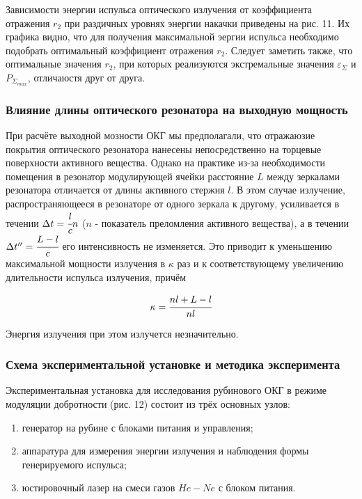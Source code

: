\documentclass[a4paper,14pt,russian]{article}
\begin{document}
Зависимости энергии испульса оптического излучения от коэффициента отражения $r_2$ при раздичных уровнях энергии накачки приведены на рис. 11. Их графика видно, что для получения максимальной эергии испульса необходимо подобрать оптимальный коэффициент отражения $r_2$. Следует заметить также, что оптимальные значения $r_2$, при которых реализуются экстремальные значения $\varepsilon_{\Sigma}$ и $P_{\Sigma_{max}}$, отличаюстя друг от друга.

\subsubsection{Влияние длины оптического резонатора на выходную мощность}

При расчёте выходной мозности ОКГ мы предполагали, что отражаюзие покрытия оптического резонатора нанесены непосредственно на торцевые поверхности активного вещества. Однако на практике из-за необходимости помещения в резонатор модулирующей ячейки расстояние $L$ между зеркалами резонатора отличается от длины активного стержня $l$. В этом случае излучение, распространяющееся в резонаторе от одного зеркала к другому, усиливается в течении $\Delta t = \cfrac {l} {c} n$ ($n$ - показатель преломления активного вещества), а в течении $\Delta t'' = \cfrac {L - l} {c}$ его интенсивность не изменяется. Это приводит к уменьшению максимальной мощности излучения в $\kappa$ раз и к соответствующему увеличению длительности испульса излучения, причём

\begin{eqnarray}
\kappa = \cfrac {n l + L - l} {n l}
\end{eqnarray}

Энергия излучения при этом излучется незначительно.

\subsubsection{Схема экспериментальной установке и методика эксперимента}

Экспериментальная установка для исследования рубинового ОКГ в режиме модуляции добротности (рис. 12) состоит из трёх основных узлов:

\begin{enumerate}
\item генератор на рубине с блоками питания и управления;
\item аппаратура для измерения энергии излучения и наблюдения формы генерируемого испульса;
\item юстировочный лазер на смеси газов $He-Ne$ с блоком питания.
\end{enumerate}
\end{document}
